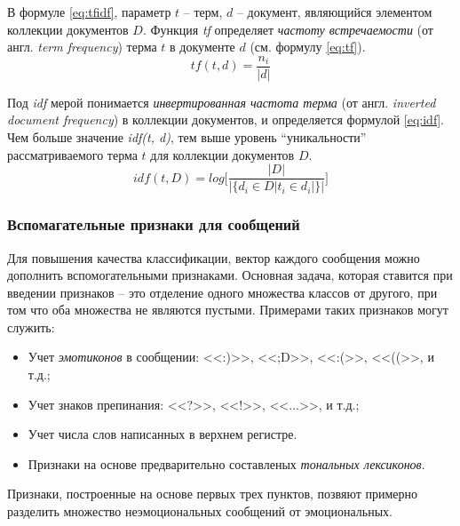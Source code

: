         В формуле \ref{eq:tfidf}, параметр $t$ -- терм, $d$ -- документ, являющийся
        элементом коллекции документов $D$. Функция {\it tf} определяет {\it частоту встречаемости}
        (от англ. {\it term frequency}) терма $t$ в документе $d$ (см. формулу \ref{eq:tf}).
        \begin{equation}
            \label{eq:tf}
            tf(t, d) = \dfrac{n_i}{|d|}
        \end{equation}

        Под {\it idf } мерой понимается {\it инвертированная частота терма} (от англ.
        {\it inverted document frequency}) в коллекции документов, и определяется
        формулой \ref{eq:idf}. Чем больше значение {\it idf(t, d)}, тем выше уровень
        ``уникальности'' рассматриваемого терма $t$ для коллекции документов $D$.
        \begin{equation}
            \label{eq:idf}
            idf(t, D) = log \Bigg[ \dfrac{|D|}{|\{d_i \in D | t_i \in d_i|\}|} \Bigg]
        \end{equation}

        \subsubsection{Вспомагательные признаки для сообщений}
        \label{sec:additionalFeatures}

        Для повышения качества классификации, вектор каждого сообщения можно дополнить
        вспомогательными признаками. Основная задача, которая ставится при введении
        признаков -- это отделение одного множества классов от другого, при том что
        оба множества не являются пустыми. Примерами таких признаков могут служить:
        \begin{itemize}
            \item Учет {\it эмотиконов} в сообщении: <<:)>>, <<;D>>, <<:(>>, <<((>>, и т.д.;
            \item Учет знаков препинания: <<?>>, <<!>>, <<...>>, и т.д.;
            \item Учет числа слов написанных в верхнем регистре.
            \item Признаки на основе предварительно составленых {\it тональных лексиконов}.
        \end{itemize}

        Признаки, построенные на основе первых трех пунктов, позвяют примерно разделить
        множество неэмоциональных сообщений от эмоциональных.

